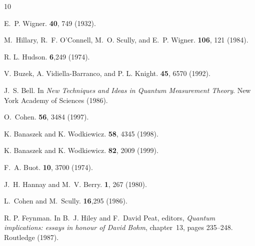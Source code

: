 \documentclass[aps,twocolumn,showpacs,nofootinbib,groupedaddress]{revtex4}
\begin{document}
%
%
\begin{thebibliography}{10}

E.~P. Wigner.
 \textbf{40}, 749 (1932).

M.~Hillary, R.~F. O'Connell, M.~O. Scully, and E.~P. Wigner.
 \textbf{106}, 121 (1984).

R. L. Hudson.
 \textbf{6},249 (1974).

V. Buzek, A. Vidiella-Barranco, and P. L. Knight.
 \textbf{45}, 6570 (1992).

J.~S. Bell.
\newblock In {\em New Techniques and Ideas in Quantum Measurement Theory}. New
  York Academy of Sciences (1986).

O.~Cohen.
 \textbf{56}, 3484 (1997).

K. Banaszek and K. Wodkiewicz.
 \textbf{58}, 4345 (1998).

K. Banaszek and K. Wodkiewicz.
 \textbf{82}, 2009 (1999).

F.~A. Buot.
 \textbf{10}, 3700 (1974).

J.~H. Hannay and M.~V. Berry.
 \textbf{1}, 267 (1980).

L.~Cohen and M.~Scully.
 \textbf{16},295 (1986).

R. P. Feynman.
\newblock In B.~J. Hiley and F.~David Peat, editors, {\em Quantum implications:
  essays in honour of {D}avid {B}ohm}, chapter~13, pages 235--248. Routledge (1987).


\end{thebibliography}
\end{document}

